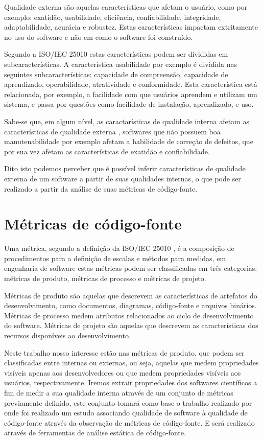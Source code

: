 \documentclass[qual, classic, a4paper]{ufbathesis}
\begin{document}
Qualidade externa são aquelas características que afetam o usuário, como por
exemplo: exatidão, usabilidade, eficiência, confiabilidade, integridade,
adaptabilidade, acurácia e robustez. Estas características impactam
extritamente no uso do software e não em como o software foi construído.

Segundo a ISO/IEC 25010 \cite{iso2011iec25010} estas características podem ser
divididas em subcaracterísticas. A característica usabilidade por exemplo é
dividida nas seguintes subcaracterísticas: capacidade de compreensão,
capacidade de aprendizado, operabilidade, atratividade e conformidade. Esta
característica está relacionada, por exemplo, a facilidade com que usuários aprendem e
utilizam um sistema, e passa por questões como facilidade de instalação,
aprendizado, e uso.

Sabe-se que, em algum nível, as caractarísticas de qualidade interna afetam as
características de qualidade externa \cite{McConnell2004}, softwares que não
possuem boa manutenabilidade por exemplo afetam a habilidade de correção de
defeitos, que por sua vez afetam as características de exatidão e
confiabilidade.

Dito isto podemos perceber que é possível inferir características de qualidade
externa de um software a partir de suas qualidades internas, o que pode ser
realizado a partir da análise de suas métricas de código-fonte.

\section{Métricas de código-fonte}

Uma métrica, segundo a definição da ISO/IEC 25010 \cite{iso2011iec25010}, é a
composição de procedimentos para a definição de escalas e métodos para
medidas, em engenharia de software estas métricas podem ser classificadas em três categorias: métricas de
produto, métricas de processo e métricas de projeto.

Métricas de produto são aquelas que
descrevem as características de artefatos do desenvolvimento, como documentos,
diagramas, código-fonte e arquivos binários. Métricas de processo medem atributos relacionados
ao ciclo de desenvolvimento do software. Métricas de projeto são aquelas
que descrevem as características dos recursos disponíveis ao desenvolvimento.

Neste trabalho nosso interesse estão nas métricas de produto, que podem ser
classificadas entre internas ou externas, ou seja, aquelas que medem
propriedades visíveis apenas aos desenvolvedores ou que medem propriedades
visíveis aos usuários, respectivamente. Iremos extrair propriedades dos
softwares científicos a fim de medir a sua qualidade interna através de um
conjunto de métricas previamente definido, este conjunto tomará como base o
trabalho realizado por  onde foi realizado um estudo
associando qualidade de software à qualidade de código-fonte através da
observação de métricas de código-fonte. E será realizado através de
ferramentas de análise estática de código-fonte.
\end{document}
